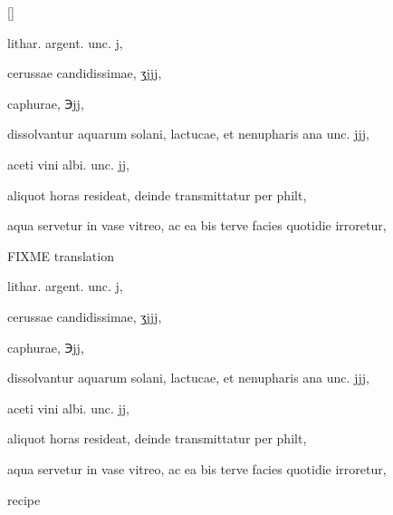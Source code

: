 \vspace{-\baselineskip}
\begin{Prescription}[H]
[\baselineskip]
\begin{prescriptionbox}{}{}
\item \textlatin{lithar. argent. unc. j},
\item \textlatin{cerussae candidissimae, ʒjjj},
\item \textlatin{caphurae, ℈jj},
\item \textlatin{dissolvantur aquarum solani, lactucae, et nenupharis ana unc. jjj},
\item \textlatin{aceti vini albi. unc. jj},
\item \textlatin{aliquot horas resideat, deinde transmittatur per philt},
\item \textlatin{aqua servetur in vase vitreo, ac ea bis terve facies quotidie irroretur},
\end{prescriptionbox}
\begin{prescriptionbox}{FIXME translation}{}
\item \textlatin{lithar. argent. unc. j},
\item \textlatin{cerussae candidissimae, ʒjjj},
\item \textlatin{caphurae, ℈jj},
\item \textlatin{dissolvantur aquarum solani, lactucae, et nenupharis ana unc. jjj},
\item \textlatin{aceti vini albi. unc. jj},
\item \textlatin{aliquot horas resideat, deinde transmittatur per philt},
\item \textlatin{aqua servetur in vase vitreo, ac ea bis terve facies quotidie irroretur},
\end{prescriptionbox}
\caption{ recipe}
\end{Prescription}

